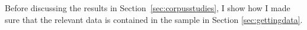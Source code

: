 \documentclass[USenglish]{article}
\begin{document}



Before discussing the results in Section~\ref{sec:corpusstudies}, I show how I made sure that the relevant data is contained in the sample in Section \ref{sec:gettingdata}.

%
%
%
\end{document}
